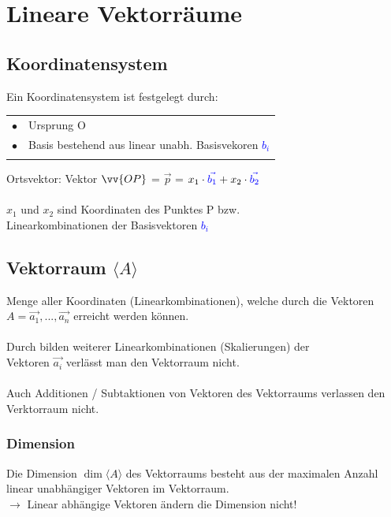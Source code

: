  \section{Lineare Vektorräume} 
		  
		  	\subsection{Koordinatensystem}
		  	Ein Koordinatensystem ist festgelegt durch: \\
		  	\begin{tabular}{ll}
		  	$\bullet$ & Ursprung O \\
		  	$\bullet$ & Basis bestehend aus linear unabh. Basisvekoren \textcolor{blue}{$b_i$} \\
		  	\\
		  	\end{tabular}
		  	
		  	Ortsvektor: \quad Vektor $\vv{OP}$ = $\vec{p}$ = $x_1 \cdot \textcolor{blue}{\vec{b_1}} + x_2 \cdot \textcolor{blue}{\vec{b_2}}$ \\
		  	\\
		  	$x_1$ und $x_2$ sind Koordinaten des Punktes P bzw. \\
		  	Linearkombinationen der Basisvektoren \textcolor{blue}{$b_i$}
		  	
		  	
			\subsection{Vektorraum  $\langle A \rangle$}		  
			Menge aller Koordinaten (Linearkombinationen), welche durch die Vektoren $A = \vec{a_1}, ... , \vec{a_n}$ erreicht werden können. \\
			\\
			Durch bilden weiterer Linearkombinationen (Skalierungen) der \\			
			Vektoren $\vec{a_i}$ verlässt man den Vektorraum nicht.\\
			\\
			Auch Additionen / Subtaktionen von Vektoren des Vektorraums verlassen den Verktorraum nicht. \\
			
			\vfill\null
			\columnbreak
			
			
			
			
			\subsubsection{Dimension}
			Die Dimension $\dim \langle A \rangle$ des Vektorraums besteht aus der maximalen Anzahl linear unabhängiger Vektoren im Vektorraum. \\
			$\rightarrow$ Linear abhängige Vektoren ändern die Dimension nicht!	  	
		  	
